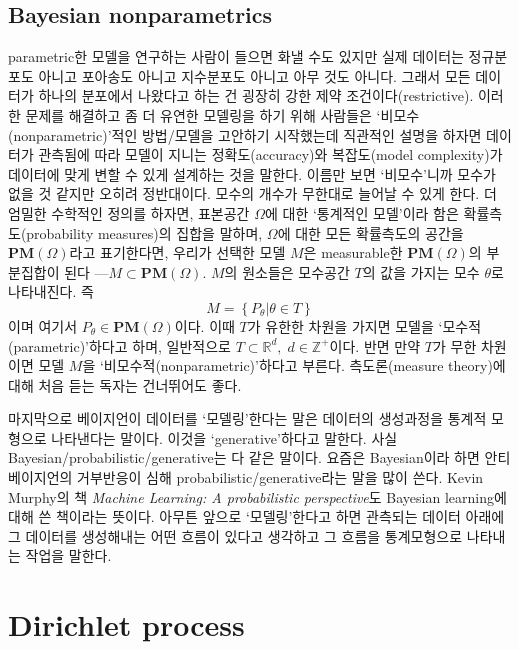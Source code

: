 \documentclass[a4paper, 10pt]{book}
\begin{document}
\section{Bayesian nonparametrics}
  parametric한 모델을 연구하는 사람이 들으면 화낼 수도 있지만 실제 데이터는 정규분포도 아니고 포아송도 아니고 지수분포도 아니고 아무 것도 아니다. 그래서 모든 데이터가 하나의 분포에서 나왔다고 하는 건 굉장히 강한 제약 조건이다(restrictive). 이러한 문제를 해결하고 좀 더 유연한 모델링을 하기 위해 사람들은 `비모수(nonparametric)'적인 방법/모델을 고안하기 시작했는데 직관적인 설명을 하자면 데이터가 관측됨에 따라 모델이 지니는 정확도(accuracy)와 복잡도(model complexity)가 데이터에 맞게 변할 수 있게 설계하는 것을 말한다. 이름만 보면 `비모수'니까 모수가 없을 것 같지만 오히려 정반대이다. 모수의 개수가 무한대로 늘어날 수 있게 한다. 더 엄밀한 수학적인 정의를 하자면, 표본공간 $\Omega$에 대한 `통계적인 모델'이라 함은 확률측도(probability measures)의 집합을 말하며, $\Omega$에 대한 모든 확률측도의 공간을 $\mathbf{PM}\left(\Omega\right)$라고 표기한다면, 우리가 선택한 모델 $M$은 measurable한 $\mathbf{PM}\left(\Omega\right)$의 부분집합이 된다 ---$M \subset \mathbf{PM}\left(\Omega\right)$. $M$의 원소들은 모수공간 $T$의 값을 가지는 모수 $\theta$로 나타내진다. 즉
  \begin{equation}
    M = \left\{P_{\theta}|\theta\in T\right\}
  \end{equation}
  이며 여기서 $P_{\theta} \in \mathbf{PM}\left(\Omega\right)$이다. 이때 $T$가 유한한 차원을 가지면 모델을 `모수적(parametric)'하다고 하며, 일반적으로 $T \subset \mathbb{R}^{d}, \; d\in \mathbb{Z}^{+}$이다. 반면 만약 $T$가 무한 차원이면 모델 $M$을 `비모수적(nonparametric)'하다고 부른다. 측도론(measure theory)에 대해 처음 듣는 독자는 건너뛰어도 좋다.\par
  마지막으로 베이지언이 데이터를 `모델링'한다는 말은 데이터의 생성과정을 통계적 모형으로 나타낸다는 말이다. 이것을 `generative'하다고 말한다. 사실 Bayesian/probabilistic/generative는 다 같은 말이다. 요즘은 Bayesian이라 하면 안티베이지언의 거부반응이 심해 probabilistic/generative라는 말을 많이 쓴다. Kevin Murphy의 책 \textit{Machine Learning: A probabilistic perspective}도 Bayesian learning에 대해 쓴 책이라는 뜻이다. 아무튼 앞으로 `모델링'한다고 하면 관측되는 데이터 아래에 그 데이터를 생성해내는 어떤 흐름이 있다고 생각하고 그 흐름을 통계모형으로 나타내는 작업을 말한다.
\chapter{Dirichlet process}
\end{document}
